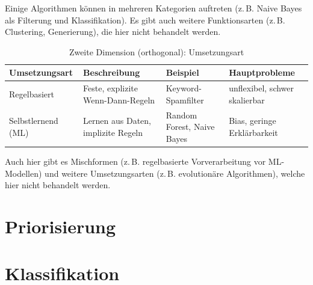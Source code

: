 Einige Algorithmen können in mehreren Kategorien auftreten (z.\,B. Naive Bayes als Filterung und Klassifikation). Es gibt auch weitere Funktionsarten (z.\,B. Clustering, Generierung), die hier nicht behandelt werden.

\begin{table}[H]
\centering
\small
\begin{tabular}{p{3.0cm}p{5.1cm}p{2.5cm}p{3.0cm}}
\toprule
\textbf{Umsetzungsart} & \textbf{Beschreibung} & \textbf{Beispiel} & \textbf{Hauptprobleme} \\
\midrule
Regelbasiert & Feste, explizite Wenn-Dann-Regeln & Keyword-Spamfilter & unflexibel, schwer skalierbar \\
\midrule
Selbstlernend (ML) & Lernen aus Daten, implizite Regeln & Random Forest, Naive Bayes & Bias, geringe Erklärbarkeit \\
\bottomrule
\end{tabular}
\caption{Zweite Dimension (orthogonal): Umsetzungsart}
\label{tab:algorithmus-umsetzungsarten-15}
\end{table}

Auch hier gibt es Mischformen (z.\,B. regelbasierte Vorverarbeitung vor ML-Modellen) und weitere Umsetzungsarten (z.\,B. evolutionäre Algorithmen), welche hier nicht behandelt werden.

\clearpage

\lstset{style=python}
\newcommand{\notebookbaseurl}{https://github.com/CyrilBlum/LeeTeX/blob/main/Grundlagen_Info/15_KI_und_Algorithmen/Code/}




\part{Priorisierung}


\part{Klassifikation}





